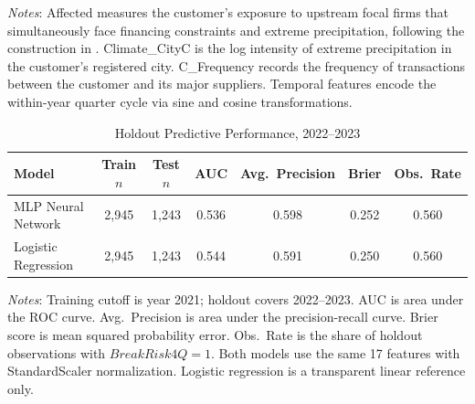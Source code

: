 \documentclass[12pt]{article}
\begin{document}
\begin{table}[H]
\begin{threeparttable}
\begin{tablenotes}
  \scriptsize
  \item \textit{Notes}: Affected measures the customer's exposure to
  upstream focal firms that simultaneously face financing constraints and
  extreme precipitation, following the construction in
  \citet{original2024climate}.  Climate\_CityC is the log intensity of
  extreme precipitation in the customer's registered city.
  C\_Frequency records the frequency of transactions between the
  customer and its major suppliers.  Temporal features encode the
  within-year quarter cycle via sine and cosine transformations.
\end{tablenotes}
\end{threeparttable}
\end{table}

\bigskip

\begin{table}[H]
\centering
\caption{Holdout Predictive Performance, 2022--2023}\label{tab:holdout}
\begin{threeparttable}
\small
\begin{tabular}{lcccccc}
\toprule
Model & Train $n$ & Test $n$ & AUC & Avg.\ Precision & Brier & Obs.\ Rate \\
\midrule
MLP Neural Network  & 2,945 & 1,243 & 0.536 & 0.598 & 0.252 & 0.560 \\
Logistic Regression & 2,945 & 1,243 & 0.544 & 0.591 & 0.250 & 0.560 \\
\bottomrule
\end{tabular}
\begin{tablenotes}
  \small
  \item \textit{Notes}: Training cutoff is year 2021; holdout covers
  2022--2023.  AUC is area under the ROC curve.  Avg.\ Precision is area
  under the precision-recall curve.  Brier score is mean squared probability
  error.  Obs.\ Rate is the share of holdout observations with
  $\textit{BreakRisk4Q}=1$.  Both models use the same 17 features with
  StandardScaler normalization.  Logistic regression is a transparent linear
  reference only.
\end{tablenotes}
\end{threeparttable}
\end{table}

\bigskip
\end{document}
